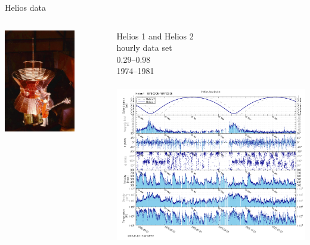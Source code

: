\begin{frame}[c]{Helios data}{}
	\begin{columns}[c]
		
		\includegraphics[width=0.7\textwidth]{../figures_of_others/images/helios2.jpg}
		
		
		Helios 1 and Helios 2\\
		hourly data set \citep{Rosenbauer1977}\\
		\SIrange{0.29}{0.98}{\au}\\
		1974--1981\\\ 
		\includegraphics[width=\textwidth]{../talk_figures/hourly_H1_1976-02-25_1977-02-25_plot.png}
		
	\end{columns}
\end{frame}
